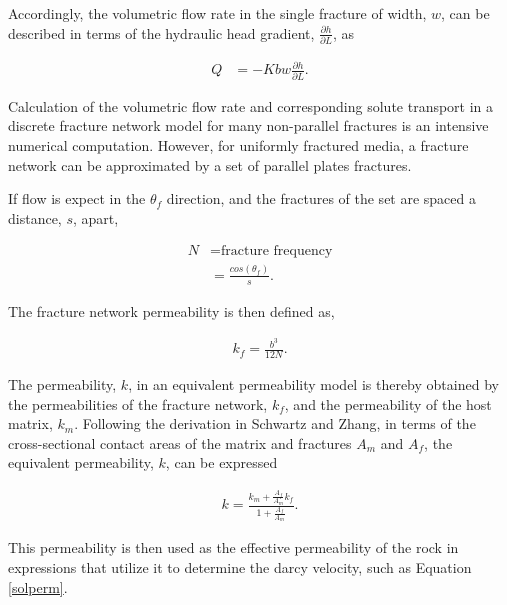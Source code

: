 Accordingly, the volumetric flow rate in the single fracture of width, $w$, can
be described in terms of the hydraulic head gradient, $\frac{\partial
h}{\partial L}$, as

\begin{align} 
  Q & = -Kbw\frac{\partial h}{\partial L}.
  \label{Qplates}
\end{align}

Calculation of the volumetric flow rate and corresponding solute transport in a
discrete fracture network model for many non-parallel fractures is an intensive
numerical computation. However, for uniformly fractured media, a fracture
network can be approximated by a set of parallel plates fractures. 

If flow is expect in the $\theta_f$ direction, and the fractures of the set are
spaced a distance, $s$, apart,

\begin{align} 
  N &= \mbox{fracture frequency}\nonumber\\ 
  &= \frac{cos(\theta_f)}{s}.  
  \label{fracfreq} 
\end{align}

The fracture network permeability is then defined as, 

\begin{align} 
  k_f =
\frac{b^3}{12N}.  
\label{fracperm} 
\end{align}

The permeability, $k$, in an equivalent permeability model is thereby obtained
by the permeabilities of the fracture network, $k_f$, and the permeability of
the host matrix, $k_m$. Following the derivation in Schwartz and Zhang, in
terms of the cross-sectional contact areas of the matrix and fractures $A_m$
and $A_f$, the equivalent permeability, $k$, can be expressed

\begin{align} 
  k = \frac{k_m + \frac{A_f}{A_m}k_f}{1+\frac{A_f}{A_m}}.
  \label{equivperm} 
\end{align}

This permeability is then used as the effective permeability of the rock in 
expressions that utilize it to determine the darcy velocity, such as Equation 
\eqref{solperm}.




